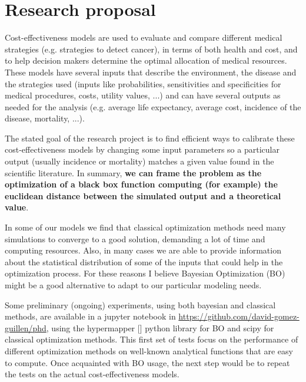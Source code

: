 
\chapter{Research proposal} %

\label{sec:proposal} %

Cost-effectiveness models are used to evaluate and compare different medical strategies (e.g. strategies to detect cancer), in terms of both health and cost, and to help decision makers determine the optimal allocation of medical resources. These models have several inputs that describe the environment, the disease and the strategies used (inputs like probabilities, sensitivities and specificities for medical procedures, costs, utility values, ...) and can have several outputs as needed for the analysis (e.g. average life expectancy, average cost, incidence of the disease, mortality, ...). 

The stated goal of the research project is to find efficient ways to calibrate these cost-effectiveness models by changing some input parameters so a particular output (usually incidence or mortality) matches a given value found in the scientific literature. In summary, \textbf{we can frame the problem as the optimization of a black box function computing (for example) the euclidean distance between the simulated output and a theoretical value}.

In some of our models we find that classical optimization methods need many simulations to converge to a good solution, demanding a lot of time and computing resources. Also, in many cases we are able to provide information about the statistical distribution of some of the inputs that could help in the optimization process. For these reasons I believe Bayesian Optimization (BO) might be a good alternative to adapt to our particular modeling needs.

Some preliminary (ongoing) experiments, using both bayesian and classical methods, are available in a jupyter notebook in \url{https://github.com/david-gomez-guillen/phd}, using the hypermapper [\cite{proposal:hypermapper}] python library for BO and scipy for classical optimization methods. This first set of tests focus on the performance of different optimization methods on well-known analytical functions that are easy to compute. Once acquainted with BO usage, the next step would be to repeat the tests on the actual cost-effectiveness models.

